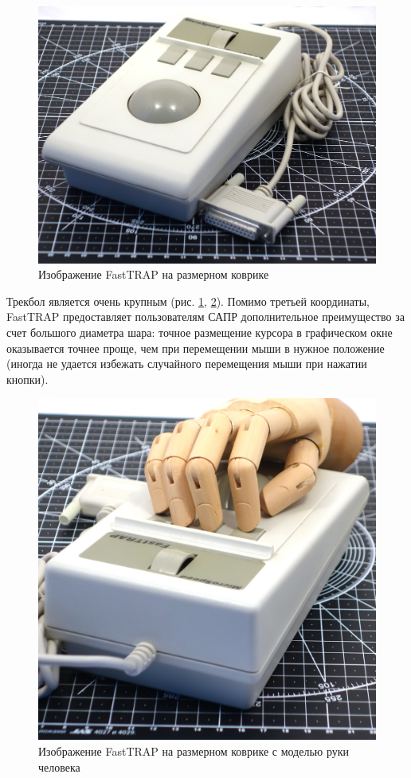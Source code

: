 \documentclass[11pt, a4paper]{article}
\begin{document}
\begin{figure}[h]
   \centering
    \includegraphics[scale=0.3]{1987_microspeed_fasttrap/size_15.jpg}
    \caption{Изображение FastTRAP на размерном коврике}
    \label{fig:FastTRAPSize}
\end{figure}

Трекбол является очень крупным (рис. \ref{fig:FastTRAPSize}, \ref{fig:FastTRAPHand}). Помимо третьей координаты, FastTRAP предоставляет пользователям САПР дополнительное преимущество за счет большого диаметра шара: точное размещение курсора в графическом окне оказывается точнее проще, чем при перемещении мыши в нужное положение (иногда не удается избежать случайного перемещения мыши при нажатии кнопки).

\begin{figure}[h]
    \centering
    \includegraphics[scale=0.25]{1987_microspeed_fasttrap/hand_15.jpg}
    \caption{Изображение FastTRAP на размерном коврике с моделью руки человека}
    \label{fig:FastTRAPHand}
\end{figure}
\end{document}
